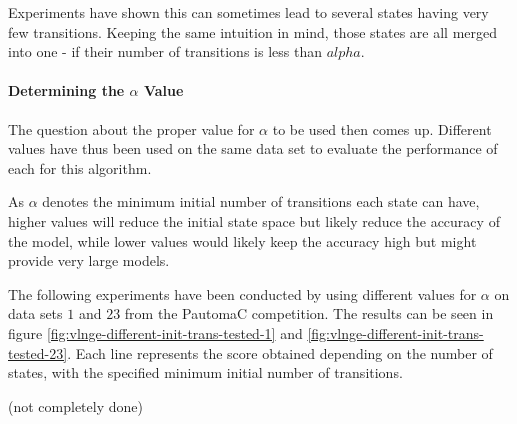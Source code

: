 \documentclass[
10pt, %
a4paper, %
oneside, %
headinclude,footinclude, %
BCOR5mm, %
]{scrartcl}
\begin{document}
Experiments have shown this can sometimes lead to several states having very few transitions. Keeping the same intuition in mind, those states are all merged into one - if their number of transitions is less than $alpha$.

\paragraph{Determining the $\alpha$ Value}

The question about the proper value for $\alpha$ to be used then comes up. Different values have thus been used on the same data set to evaluate the performance of each for this algorithm.

As $\alpha$ denotes the minimum initial number of transitions each state can have, higher values will reduce the initial state space but likely reduce the accuracy of the model, while lower values would likely keep the accuracy high but might provide very large models.

The following experiments have been conducted by using different values for $\alpha$ on data sets $1$ and $23$ from the PautomaC competition. The results can be seen in figure \ref{fig:vlnge-different-init-trans-tested-1} and \ref{fig:vlnge-different-init-trans-tested-23}. Each line represents the score obtained depending on the number of states, with the specified minimum initial number of transitions.

(not completely done)
\end{document}
